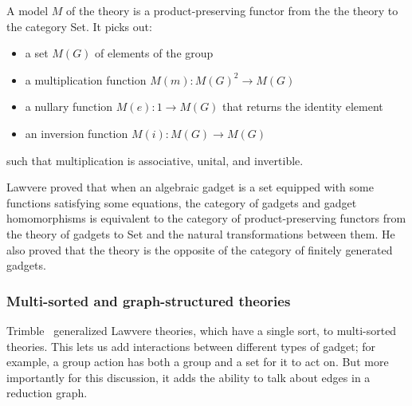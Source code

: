 \documentclass{article}
\begin{document}
A model $M$ of the theory is a product-preserving functor from the the theory to the category Set.  It picks out:
\begin{itemize}
    \item a set $M(G)$ of elements of the group
    \item a multiplication function $M(m)\colon M(G)^2 \to M(G)$
    \item a nullary function $M(e): 1 \to M(G)$ that returns the identity element
    \item an inversion function $M(i): M(G) \to M(G)$
\end{itemize}
such that multiplication is associative, unital, and invertible.

Lawvere proved that when an algebraic gadget is a set equipped with some functions satisfying some equations, the category of gadgets and gadget homomorphisms is equivalent to the category of product-preserving functors from the theory of gadgets to Set and the natural transformations between them.  He also proved that the theory is the opposite of the category of finitely generated gadgets.

\subsubsection{Multi-sorted and graph-structured theories}

Trimble~\cite{Trimble2018} generalized Lawvere theories, which have a single sort, to multi-sorted theories.  This lets us add interactions between different types of gadget; for example, a group action has both a group and a set for it to act on.  But more importantly for this discussion, it adds the ability to talk about edges in a reduction graph.
\end{document}
